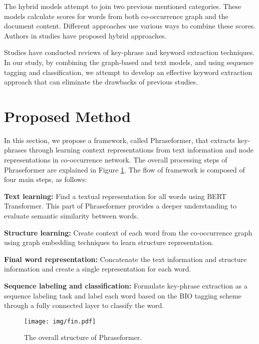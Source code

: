 \documentclass[review,3p]{elsarticle}
\begin{document}
The hybrid models attempt to join two previous mentioned categories. These models calculate scores for words from both co-occurrence graph and the document content. Different approaches use various ways to combine these scores. Authors in studies \cite{danesh2015sgrank, zhang2017mike, mahata2018key2vec, mahata2018theme} have proposed hybrid approaches.

Studies \cite{siddiqi2015keyword, merrouni2019automatic, unlu2019survey, papagiannopoulou2020review, firoozeh2020keyword} have conducted reviews of key-phrase and keyword extraction techniques. In our study, by combining the graph-based and text models, and using sequence tagging and classification, we attempt to develop an effective keyword extraction approach that can eliminate the drawbacks of previous studies.

\section{Proposed Method}\label{Proposed_Method}
In this section, we propose a framework, called Phraseformer, that extracts key-phrases through learning context representations from text information and node representations in co-occurrence network. The overall processing steps of Phraseformer are explained in Figure \ref{proposed_method_fig}. The flow of framework  is composed of four main
steps, as follows:

\textbf{Text learning:} Find a textual representation for all words using BERT Transformer. This part of Phraseformer provides a deeper understanding to evaluate semantic similarity between words.

\textbf{Structure learning:} Create context of each word from the co-occurrence graph using graph embedding techniques to learn structure representation.

\textbf{Final word representation:} Concatenate the text information and structure information and create a single representation for each word.

\textbf{Sequence labeling and classification:} Formulate key-phrase  extraction  as  a  sequence  labeling  task and label each word based on the BIO tagging scheme through a fully connected layer to classify the word.

\begin{figure}
	\centering
	\texttt{[image: img/fin.pdf]}
	\caption{The overall structure of Phraseformer.}
	\label{proposed_method_fig}
\end{figure}
\end{document}
